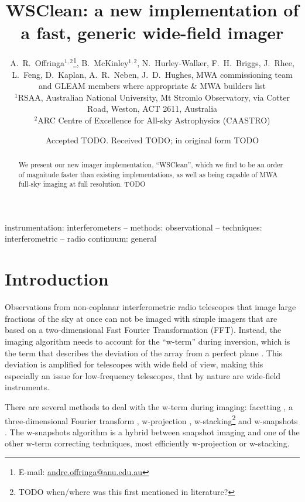 \documentclass[useAMS,usenatbib]{mn2e}
\title[WSClean: a new imager]{WSClean: a new implementation of a fast, generic wide-field imager}
\author[A.~R.~Offringa et al.]{A.~R.~Offringa$^{1,2}$\thanks{E-mail:
\url{andre.offringa@anu.edu.au}}, B.~McKinley$^{1,2}$, N.~Hurley-Walker, 
F.~H.~Briggs, \newauthor
J.~Rhee, L.~Feng, D.~Kaplan, A.~R.~Neben, J.~D.~Hughes, MWA commissioning team\newauthor
and GLEAM members where appropriate \& MWA builders list
\\
$^{1}$RSAA, Australian National University, Mt Stromlo Observatory, via Cotter Road, Weston, ACT 2611, Australia \\
$^{2}$ARC Centre of Excellence for All-sky Astrophysics (CAASTRO) \\
}
\begin{document}
\date{Accepted TODO. Received TODO; in original form TODO}
\pagerange{\pageref{firstpage}--\pageref{lastpage}}

\label{firstpage}
\maketitle

\begin{abstract}
We present our new imager implementation, ``WSClean'', which we find to be an order of magnitude faster than existing implementations, as well as being capable of MWA full-sky imaging at full resolution.
TODO
\end{abstract}

\begin{keywords}
instrumentation: interferometers -- methods: observational -- techniques: interferometric -- radio continuum: general
\end{keywords}

\section{Introduction}

Observations from non-coplanar interferometric radio telescopes that image large fractions of the sky at once can not be imaged with simple imagers that are based on a two-dimensional Fast Fourier Transformation (FFT). Instead, the imaging algorithm needs to account for the ``w-term'' during inversion, which is the term that describes the deviation of the array from a perfect plane \citep{perley-noncoplanar-arrays}. This deviation is amplified for telescopes with wide field of view, making this especially an issue for low-frequency telescopes, that by nature are wide-field instruments.

There are several methods to deal with the w-term during imaging: facetting \citep{facetting-cornwell}, a three-dimensional Fourier transform \citep{perley-noncoplanar-arrays}, w-projection \citep{wprojection-cornwell}, w-stacking\footnote{TODO when/where was this first mentioned in literature?} \citep{widefield-imaging-ska-cornwell} and w-snapshots \citep{widefield-imaging-ska-cornwell}. The w-snapshots algorithm is a hybrid between snapshot imaging and one of the other w-term correcting techniques, most efficiently w-projection or w-stacking.
\end{document}

